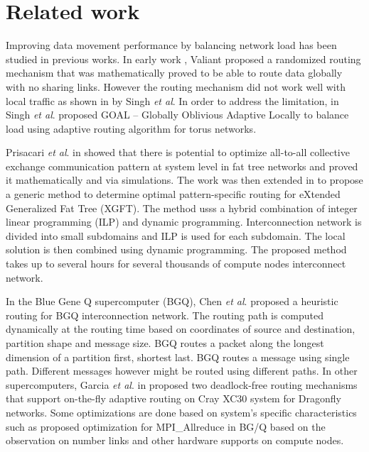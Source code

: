 \section{Related work}
\label{sec:relatedwork}

Improving data movement performance by balancing network load has been studied in previous works. In early work \cite{Valiant81:Routing}, Valiant proposed a randomized routing mechanism that was mathematically proved to be able to route data globally with no sharing links. However the routing mechanism did not work well with local traffic as shown in \cite{singh2003:GOAL} by Singh \textit{et al}. In order to address the limitation, in \cite{singh2003:GOAL} Singh \textit{et al}. proposed GOAL -- Globally Oblivious Adaptive Locally to balance load using adaptive routing algorithm for torus networks. 

Prisacari \textit{et al}. in \cite{Prisacari13a} showed that there is potential to optimize all-to-all collective exchange communication pattern at system level in fat tree networks and proved it mathematically and via simulations. The work was then extended in \cite{Prisacari13b} to propose a generic method to determine optimal pattern-specific routing for eXtended Generalized Fat Tree (XGFT). The method usss a hybrid combination of integer linear programming (ILP) and dynamic programming. Interconnection network is divided into small subdomains and ILP is used for each subdomain. The local solution is then combined using dynamic programming. The proposed method takes up to several hours for several thousands of compute nodes interconnect network.

In the Blue Gene Q supercomputer (BGQ), Chen \textit{et al}. \cite{Chen:BGQ} proposed a heuristic routing for BGQ interconnection network. The routing path is computed dynamically at the routing time based on coordinates of source and destination, partition shape and message size. BGQ routes a packet along the longest dimension of a partition first, shortest last. BGQ routes a message using single path. Different messages however might be routed using different paths. In other supercomputers, Garcia \textit{et al}. in \cite{garcia2013:CrayDragonfly} proposed two deadlock-free routing mechanisms that support on-the-fly adaptive routing on Cray XC30 system for Dragonfly networks. 
Some optimizations are done based on system’s specific characteristics such as \cite{Kumar:Allreduce} proposed optimization for MPI\_Allreduce in BG/Q based on the observation on number links and other hardware supports on compute nodes.

